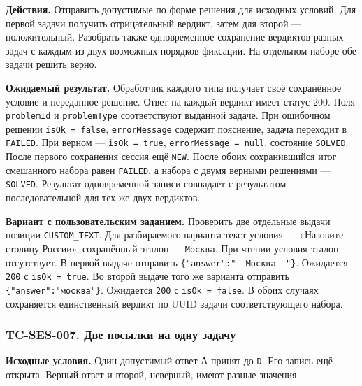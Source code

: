 \documentclass[12pt,a4paper]{article}
\begin{document}
\textbf{Действия.} Отправить допустимые по форме решения для исходных условий. Для первой задачи получить отрицательный вердикт, затем для второй --- положительный. Разобрать также одновременное сохранение вердиктов разных задач с каждым из двух возможных порядков фиксации. На отдельном наборе обе задачи решить верно.

\textbf{Ожидаемый результат.} Обработчик каждого типа получает своё сохранённое условие и переданное решение. Ответ на каждый вердикт имеет статус 200. Поля \texttt{problemId} и \texttt{problem\allowbreak{}Type} соответствуют выданной задаче. При ошибочном решении \texttt{is\allowbreak{}Ok =\allowbreak{} false}, \texttt{error\allowbreak{}Message} содержит пояснение, задача переходит в \texttt{FAILED}. При верном --- \texttt{is\allowbreak{}Ok =\allowbreak{} true}, \texttt{error\allowbreak{}Message =\allowbreak{} null}, состояние \texttt{SOLVED}. После первого сохранения сессия ещё \texttt{NEW}. После обоих сохранившийся итог смешанного набора равен \texttt{FAILED}, а набора с двумя верными решениями --- \texttt{SOLVED}. Результат одновременной записи совпадает с результатом последовательной для тех же двух вердиктов.

\textbf{Вариант с пользовательским заданием.} Проверить две отдельные выдачи позиции \texttt{CUSTOM\_\allowbreak{}TEXT}. Для разбираемого варианта текст условия --- «Назовите столицу России», сохранённый эталон --- \texttt{Москва}. При чтении условия эталон отсутствует. В первой выдаче отправить \texttt{\{"answer":"\ \ Москва\ \ "\}}. Ожидается \texttt{200} с \texttt{is\allowbreak{}Ok =\allowbreak{} true}. Во второй выдаче того же варианта отправить \texttt{\{"answer":"москва"\}}. Ожидается \texttt{200} с \texttt{is\allowbreak{}Ok =\allowbreak{} false}. В обоих случаях сохраняется единственный вердикт по UUID задачи соответствующего набора.

\subsubsection{TC-SES-007. Две посылки на одну задачу}\label{tc-ses-007-ux434ux432ux435-ux43fux43eux441ux44bux43bux43aux438-ux43dux430-ux43eux434ux43dux443-ux437ux430ux434ux430ux447ux443}

\hypertarget{tc-ses-007-две-посылки-на-одну-задачу}{}

\hypertarget{tc-ses-007}{}

\textbf{Исходные условия.} Один допустимый ответ А принят до \texttt{D}. Его запись ещё открыта. Верный ответ и второй, неверный, имеют разные значения.
\end{document}
